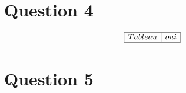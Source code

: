 \documentclass{article}[letterpaper, 11pt]
\begin{document}
\newpage
\section{Question 4}
\[
\begin{array}{|l|c|} \hline %
Tableau & oui\\ \hline %
\end{array}\]

\newpage
\section{Question 5}








\end{document}
